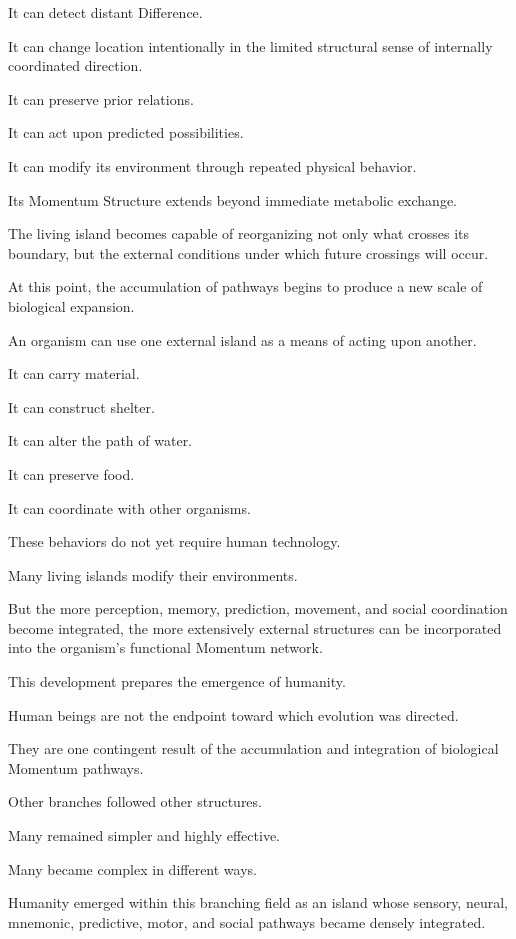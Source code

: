 It can detect distant Difference.

It can change location intentionally in the limited structural sense of internally coordinated direction.

It can preserve prior relations.

It can act upon predicted possibilities.

It can modify its environment through repeated physical behavior.

Its Momentum Structure extends beyond immediate metabolic exchange.

The living island becomes capable of reorganizing not only what crosses its boundary, but the external conditions under which future crossings will occur.

At this point, the accumulation of pathways begins to produce a new scale of biological expansion.

An organism can use one external island as a means of acting upon another.

It can carry material.

It can construct shelter.

It can alter the path of water.

It can preserve food.

It can coordinate with other organisms.

These behaviors do not yet require human technology.

Many living islands modify their environments.

But the more perception, memory, prediction, movement, and social coordination become integrated, the more extensively external structures can be incorporated into the organism’s functional Momentum network.

This development prepares the emergence of humanity.

Human beings are not the endpoint toward which evolution was directed.

They are one contingent result of the accumulation and integration of biological Momentum pathways.

Other branches followed other structures.

Many remained simpler and highly effective.

Many became complex in different ways.

Humanity emerged within this branching field as an island whose sensory, neural, mnemonic, predictive, motor, and social pathways became densely integrated.

